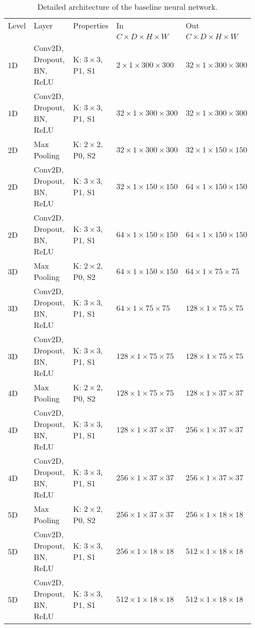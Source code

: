 \begin{sidewaystable}[htbp]
   \centering
   \caption[Architecture of FCNN 2D Baseline]{Detailed architecture of the baseline neural network.}
   \begin{tabular}{l*{4}{l}}
      \toprule
      Level	& Layer						& Properties 					& In 									& Out	\\
      		&							&								& $C \times D \times H \times W$		& $C \times D \times H \times W$		\\
      \midrule
      1D	& Conv2D, Dropout, BN, ReLU & K: $3 \times 3$, P1, S1		& $2 \times 1 \times 300 \times 300$	& $32 \times 1 \times 300 \times 300$	\\
      1D	& Conv2D, Dropout, BN, ReLU & K: $3 \times 3$, P1, S1		& $32 \times 1 \times 300 \times 300$	& $32 \times 1 \times 300 \times 300$	\\
      2D	& Max Pooling				& K: $2 \times 2$, P0, S2		& $32 \times 1 \times 300 \times 300$	& $32 \times 1 \times 150 \times 150$	\\
      2D	& Conv2D, Dropout, BN, ReLU & K: $3 \times 3$, P1, S1		& $32 \times 1 \times 150 \times 150$	& $64 \times 1 \times 150 \times 150$	\\
      2D	& Conv2D, Dropout, BN, ReLU & K: $3 \times 3$, P1, S1		& $64 \times 1 \times 150 \times 150$	& $64 \times 1 \times 150 \times 150$	\\
      3D	& Max Pooling				& K: $2 \times 2$, P0, S2		& $64 \times 1 \times 150 \times 150$	& $64 \times 1 \times 75 \times 75$		\\
      3D	& Conv2D, Dropout, BN, ReLU & K: $3 \times 3$, P1, S1		& $64 \times 1 \times 75 \times 75$		& $128 \times 1 \times 75 \times 75$	\\
      3D	& Conv2D, Dropout, BN, ReLU & K: $3 \times 3$, P1, S1		& $128 \times 1 \times 75 \times 75$	& $128 \times 1 \times 75 \times 75$	\\
      4D	& Max Pooling				& K: $2 \times 2$, P0, S2		& $128 \times 1 \times 75 \times 75$	& $128 \times 1 \times 37 \times 37$	\\
      4D	& Conv2D, Dropout, BN, ReLU & K: $3 \times 3$, P1, S1		& $128 \times 1 \times 37 \times 37$	& $256 \times 1 \times 37 \times 37$	\\
      4D	& Conv2D, Dropout, BN, ReLU & K: $3 \times 3$, P1, S1		& $256 \times 1 \times 37 \times 37$	& $256 \times 1 \times 37 \times 37$	\\
      5D	& Max Pooling				& K: $2 \times 2$, P0, S2		& $256 \times 1 \times 37 \times 37$	& $256 \times 1 \times 18 \times 18$	\\
      5D	& Conv2D, Dropout, BN, ReLU & K: $3 \times 3$, P1, S1		& $256 \times 1 \times 18 \times 18$	& $512 \times 1 \times 18 \times 18$	\\
      5D	& Conv2D, Dropout, BN, ReLU & K: $3 \times 3$, P1, S1		& $512 \times 1 \times 18 \times 18$	& $512 \times 1 \times 18 \times 18$	\\
      

\end{tabular}
\end{sidewaystable}
